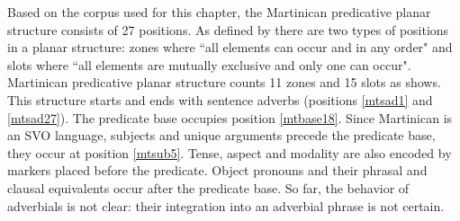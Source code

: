 \documentclass[output=paper]{langscibook}
\begin{document}
Based on the corpus used for this chapter, the Martinican predicative planar structure consists of 27 positions. As defined by \citet{Tallman2020b} there are two types of positions in a planar structure: zones where “all elements can occur and in any order" and slots where “all elements are mutually exclusive and only one can occur". Martinican predicative planar structure counts 11 zones and 15 slots as  shows. This structure starts and ends with sentence adverbs (positions \ref{mtsad1} and \ref{mtsad27}). The predicate base occupies position \ref{mtbase18}. Since Martinican is an SVO language, subjects and unique arguments precede the predicate base, they occur at position \ref{mtsub5}. Tense, aspect and modality are also encoded by markers placed before the predicate. Object pronouns and their phrasal and clausal equivalents occur after the predicate base. So far, the behavior of adverbials is not clear: their integration into an adverbial phrase is not certain.
\end{document}
